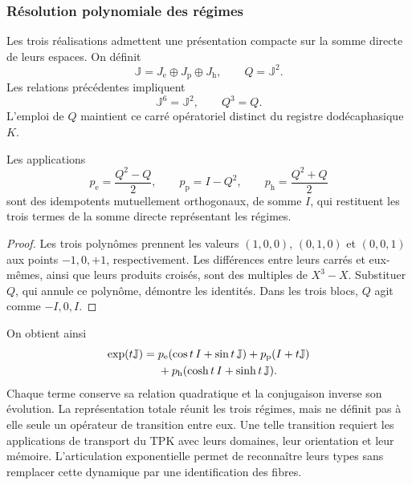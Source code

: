 \subsubsection{Résolution polynomiale des régimes}

Les trois réalisations admettent une présentation compacte sur la somme
directe de leurs espaces. On définit
\[
 \mathbb J=J_{\mathrm e}\oplus J_{\mathrm p}\oplus J_{\mathrm h},
 \qquad Q=\mathbb J^2.
\]
Les relations précédentes impliquent
\[
 \mathbb J^6=\mathbb J^2,\qquad Q^3=Q.
\]
L’emploi de \(Q\) maintient ce carré opératoriel distinct du registre
dodécaphasique \(K\).

\begin{proposition}
\label{euler-trit-proyectores}
Les applications
\[
 p_{\mathrm e}=\frac{Q^2-Q}{2},\qquad
 p_{\mathrm p}=I-Q^2,\qquad
 p_{\mathrm h}=\frac{Q^2+Q}{2}
\]
sont des idempotents mutuellement orthogonaux, de somme \(I\), qui restituent les trois
termes de la somme directe représentant les régimes.
\end{proposition}
\begin{proof}
Les trois polynômes prennent les valeurs \((1,0,0)\), \((0,1,0)\) et
\((0,0,1)\) aux points \(-1,0,+1\), respectivement. Les différences
entre leurs carrés et eux-mêmes, ainsi que leurs produits croisés, sont
des multiples de \(X^3-X\). Substituer \(Q\), qui annule ce polynôme, démontre
les identités. Dans les trois blocs, \(Q\) agit comme \(-I,0,I\).
\end{proof}

On obtient ainsi
\begin{align}
 \exp(t\mathbb J)
 ={}&p_{\mathrm e}(\cos t\,I+\sin t\,\mathbb J)
   +p_{\mathrm p}(I+t\mathbb J)\notag\\
   &+p_{\mathrm h}(\cosh t\,I+\sinh t\,\mathbb J).
 \label{euler-trit-exponencial-total}
\end{align}
Chaque terme conserve sa relation quadratique et la conjugaison inverse
son évolution. La représentation totale réunit les trois régimes, mais ne
définit pas à elle seule un opérateur de transition entre eux. Une telle transition
requiert les applications de transport du TPK avec leurs domaines, leur orientation et
leur mémoire. L’articulation exponentielle permet de reconnaître leurs types sans
remplacer cette dynamique par une identification des fibres.

